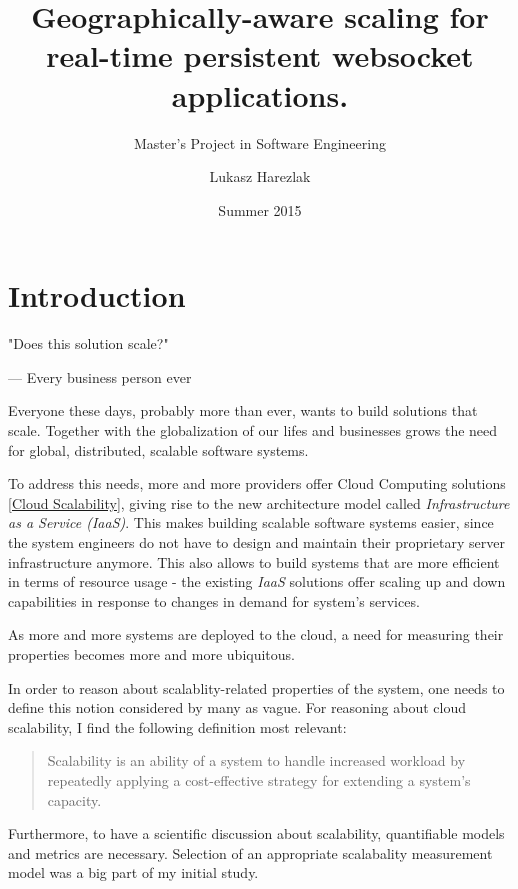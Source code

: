 \documentclass{uvamscse}
\title{Geographically-aware scaling for real-time persistent websocket applications.}
\subtitle{Master's Project in Software Engineering}
\date{Summer 2015}
\author{Lukasz Harezlak}
\begin{document}
\maketitle


\chapter{Introduction}

\epigraph{"Does this solution scale?"}{--- Every business person ever}

Everyone these days, probably more than ever, wants to build solutions that scale. Together with the globalization of our lifes and businesses grows the need for global, distributed, scalable software systems.

To address this needs, more and more providers offer Cloud Computing solutions \ref{Cloud Scalability}, giving rise to the new architecture model called \textit{Infrastructure as a Service (IaaS)}. This makes building scalable software systems easier, since the system engineers do not have to design and maintain their proprietary server infrastructure anymore. This also allows to build systems that are more efficient in terms of resource usage - the existing \textit{IaaS} solutions offer scaling up and down capabilities in response to changes in demand for system's services.

As more and more systems are deployed to the cloud, a need for measuring their properties becomes more and more ubiquitous.

In order to reason about scalablity-related properties of the system, one needs to define this notion considered by many as vague. For reasoning about cloud scalability, I find the following definition most relevant:

\begin{quote}
\cite{WeinstockOnSystem2006} Scalability is an ability of a system to handle increased workload by repeatedly applying a cost-effective strategy for extending a system’s capacity.
\end{quote}

Furthermore, to have a scientific discussion about scalability, quantifiable models and metrics are necessary. Selection of an appropriate scalabality measurement model was a big part of my initial study.
\end{document}
